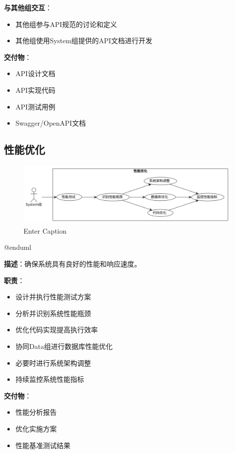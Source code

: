 \documentclass[a4paper,12pt]{article}
\begin{document}
\textbf{与其他组交互}：
\begin{itemize}
  \item 其他组参与API规范的讨论和定义
  \item 其他组使用System组提供的API文档进行开发
\end{itemize}

\textbf{交付物}：
\begin{itemize}
  \item API设计文档
  \item API实现代码
  \item API测试用例
  \item Swagger/OpenAPI文档
\end{itemize}

\subsection{性能优化}

\begin{figure}[H]
    \centering
    \includegraphics[width=0.75\linewidth]{assets/image5.png}
    \caption{Enter Caption}
    \label{fig:enter-label}
\end{figure}
@enduml


\textbf{描述}：确保系统具有良好的性能和响应速度。

\textbf{职责}：
\begin{itemize}
  \item 设计并执行性能测试方案
  \item 分析并识别系统性能瓶颈
  \item 优化代码实现提高执行效率
  \item 协同Data组进行数据库性能优化
  \item 必要时进行系统架构调整
  \item 持续监控系统性能指标
\end{itemize}

\textbf{交付物}：
\begin{itemize}
  \item 性能分析报告
  \item 优化实施方案
  \item 性能基准测试结果
\end{itemize}
\end{document}
